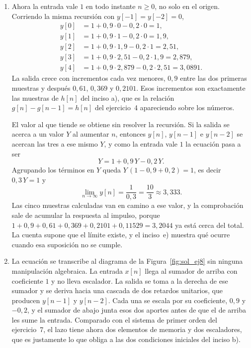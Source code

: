 \documentclass[10pt,a4paper]{article}
\begin{document}
\begin{enumerate}
		\item Ahora la entrada vale $1$ en todo instante
		$n\ge 0$, no solo en el origen. Corriendo la misma recursión con $y[-1]=y[-2]=0$,
		\[
			\begin{aligned}
			y[0] &= 1 + 0{,}9\cdot 0 - 0{,}2\cdot 0        = 1, \\
			y[1] &= 1 + 0{,}9\cdot 1 - 0{,}2\cdot 0        = 1{,}9, \\
			y[2] &= 1 + 0{,}9\cdot 1{,}9 - 0{,}2\cdot 1    = 2{,}51, \\
			y[3] &= 1 + 0{,}9\cdot 2{,}51 - 0{,}2\cdot 1{,}9 = 2{,}879, \\
			y[4] &= 1 + 0{,}9\cdot 2{,}879 - 0{,}2\cdot 2{,}51 = 3{,}0891.
			\end{aligned}
		\]
		La salida crece con incrementos cada vez menores, $0{,}9$ entre las dos primeras
		muestras y después $0{,}61$, $0{,}369$ y $0{,}2101$. Esos incrementos son exactamente
		las muestras de $h[n]$ del inciso a), que es la relación $g[n]-g[n-1]=h[n]$ del
		ejercicio~4 apareciendo sobre los números.

		El valor al que tiende se obtiene sin resolver la recursión. Si la salida se acerca a
		un valor $Y$ al aumentar $n$, entonces $y[n]$, $y[n-1]$ e $y[n-2]$ se acercan las tres
		a ese mismo $Y$, y como la entrada vale $1$ la ecuación pasa a ser
		\[
			Y = 1 + 0{,}9\,Y - 0{,}2\,Y.
		\]
		Agrupando los términos en $Y$ queda $Y\,(1-0{,}9+0{,}2)=1$, es decir $0{,}3\,Y=1$ y
		\[
			\boxed{\;\lim_{n\to\infty} y[n] = \frac{1}{0{,}3} = \frac{10}{3} \approx 3{,}333.\;}
		\]
		Las cinco muestras calculadas van en camino a ese valor, y la comprobación sale de
		acumular la respuesta al impulso, porque $1+0{,}9+0{,}61+0{,}369+0{,}2101+0{,}11529 =
		3{,}2044$ ya está cerca del total. La cuenta supone que el límite existe, y el
		inciso~e) muestra qué ocurre cuando esa suposición no se cumple.

		\item La ecuación se transcribe al diagrama de la
		Figura~\ref{fig:sol_ej8} sin ninguna manipulación algebraica. La entrada $x[n]$ llega
		al sumador de arriba con coeficiente $1$ y no lleva escalador. La salida se toma a la
		derecha de ese sumador y se deriva hacia una cascada de dos retardos unitarios, que
		producen $y[n-1]$ y $y[n-2]$. Cada una se escala por su coeficiente, $0{,}9$ y
		$-0{,}2$, y el sumador de abajo junta esos dos aportes antes de que el de arriba les
		sume la entrada. Comparado con el sistema de primer orden del ejercicio~7, el lazo
		tiene ahora dos elementos de memoria y dos escaladores, que es justamente lo que
		obliga a las dos condiciones iniciales del inciso b).


\end{enumerate}
\end{document}

